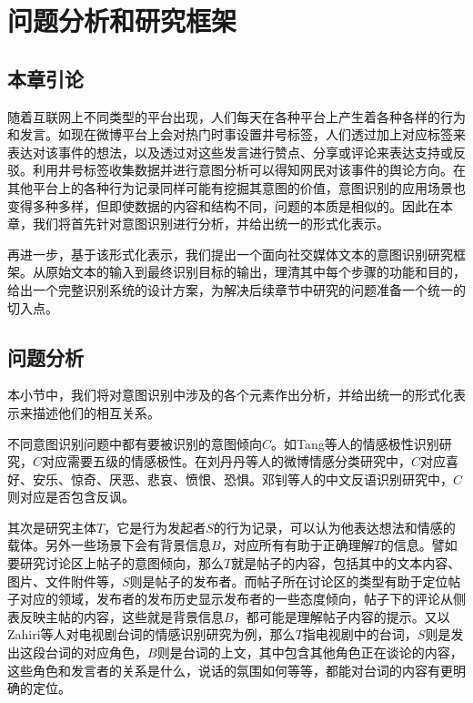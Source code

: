 \chapter{问题分析和研究框架}
\label{cha:problem_framework}

\section{本章引论}

随着互联网上不同类型的平台出现，人们每天在各种平台上产生着各种各样的行为和发言。如现在微博平台上会对热门时事设置井号标签，人们透过加上对应标签来表达对该事件的想法，以及透过对这些发言进行赞点、分享或评论来表达支持或反驳。利用井号标签收集数据并进行意图分析可以得知网民对该事件的舆论方向。在其他平台上的各种行为记录同样可能有挖掘其意图的价值，意图识别的应用场景也变得多种多样，但即使数据的内容和结构不同，问题的本质是相似的。因此在本章，我们将首先针对意图识别进行分析，并给出统一的形式化表示。

再进一步，基于该形式化表示，我们提出一个面向社交媒体文本的意图识别研究框架。从原始文本的输入到最终识别目标的输出，理清其中每个步骤的功能和目的，给出一个完整识别系统的设计方案，为解决后续章节中研究的问题准备一个统一的切入点。

\section{问题分析}

本小节中，我们将对意图识别中涉及的各个元素作出分析，并给出统一的形式化表示来描述他们的相互关系。

不同意图识别问题中都有要被识别的意图倾向$C$。如Tang等人\cite{tang2015learning}的情感极性识别研究，$C$对应需要五级的情感极性。在刘丹丹等人\cite{刘丹丹2015基于}的微博情感分类研究中，$C$对应喜好、安乐、惊奇、厌恶、悲哀、愤恨、恐惧。邓钊等人\cite{2015面向微博的中文反语识别研究}的中文反语识别研究中，$C$则对应是否包含反讽。

其次是研究主体$T$，它是行为发起者$S$的行为记录，可以认为他表达想法和情感的载体。另外一些场景下会有背景信息$B$，对应所有有助于正确理解$T$的信息。譬如要研究讨论区上帖子的意图倾向，那么$T$就是帖子的内容，包括其中的文本内容、图片、文件附件等，$S$则是帖子的发布者。而帖子所在讨论区的类型有助于定位帖子对应的领域，发布者的发布历史显示发布者的一些态度倾向，帖子下的评论从侧表反映主帖的内容，这些就是背景信息$B$，都可能是理解帖子内容的提示。又以Zahiri等人\cite{Zahiri2017Emotion}对电视剧台词的情感识别研究为例，那么$T$指电视剧中的台词，$S$则是发出这段台词的对应角色，$B$则是台词的上文，其中包含其他角色正在谈论的内容，这些角色和发言者的关系是什么，说话的氛围如何等等，都能对台词的内容有更明确的定位。

